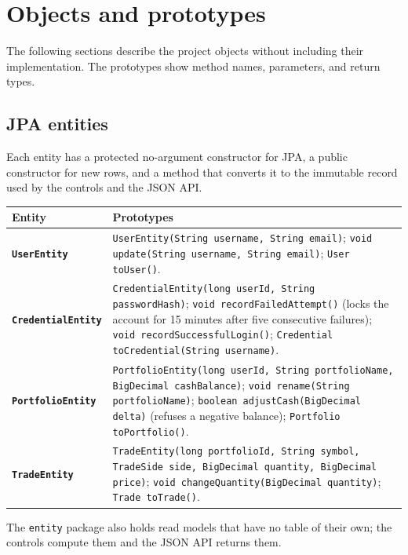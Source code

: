 \documentclass[12pt,a4paper]{article}
\newcommand{\code}[1]{\texttt{\small #1}}
\newcommand{\class}[1]{\textbf{\code{#1}}}
\begin{document}
\section{Objects and prototypes}

The following sections describe the project objects without including their
implementation. The prototypes show method names, parameters, and return
types.

\subsection{JPA entities}

Each entity has a protected no-argument constructor for JPA, a public
constructor for new rows, and a method that converts it to the immutable
record used by the controls and the JSON API.

\begin{longtable}{>{\raggedright\arraybackslash}p{3.2cm}
                  >{\raggedright\arraybackslash}p{10.3cm}}
\toprule
\textbf{Entity} & \textbf{Prototypes}\\
\midrule
\endhead
\class{UserEntity} & \code{UserEntity(String username, String email)};
\code{void update(String username, String email)}; \code{User toUser()}.\\
\class{CredentialEntity} & \code{CredentialEntity(long userId, String
passwordHash)}; \code{void recordFailedAttempt()} (locks the account for 15
minutes after five consecutive failures); \code{void recordSuccessfulLogin()};
\code{Credential toCredential(String username)}.\\
\class{PortfolioEntity} & \code{PortfolioEntity(long userId, String
portfolioName, BigDecimal cashBalance)}; \code{void rename(String
portfolioName)}; \code{boolean adjustCash(BigDecimal delta)} (refuses a
negative balance); \code{Portfolio toPortfolio()}.\\
\class{TradeEntity} & \code{TradeEntity(long portfolioId, String symbol,
TradeSide side, BigDecimal quantity, BigDecimal price)}; \code{void
changeQuantity(BigDecimal quantity)}; \code{Trade toTrade()}.\\
\bottomrule
\end{longtable}

The \code{entity} package also holds read models that have no table of their
own; the controls compute them and the JSON API returns them.
\end{document}
